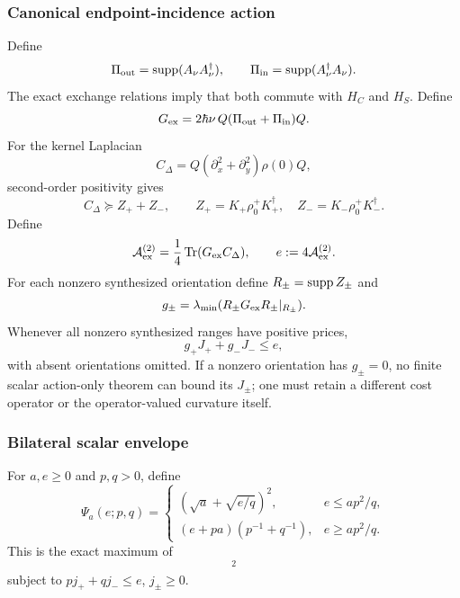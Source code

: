 \subsubsection{Canonical endpoint-incidence action}

Define
\begin{equation}
\Pi_{\rm out}=\operatorname{supp}(A_\nu A_\nu^\dagger),
\qquad
\Pi_{\rm in}=\operatorname{supp}(A_\nu^\dagger A_\nu).
\end{equation}
The exact exchange relations imply that both commute with $H_C$ and $H_S$. Define
\begin{equation}
G_{\rm ex}
=2\hbar\nu\,Q(\Pi_{\rm out}+\Pi_{\rm in})Q.
\label{eq:mixed-r1-Gex}
\end{equation}
For the kernel Laplacian
\begin{equation}
C_\Delta=Q(\partial_x^2+\partial_y^2)\rho(0)Q,
\end{equation}
second-order positivity gives
\begin{equation}
C_\Delta\succeq Z_++Z_-,
\qquad
Z_+=K_+\rho_0^+K_+^\dagger,
\quad
Z_-=K_-\rho_0^+K_-^\dagger.
\end{equation}
Define
\begin{equation}
\mathcal A_{\rm ex}^{(2)}=\frac14\operatorname{Tr}(G_{\rm ex}C_\Delta),
\qquad
e:=4\mathcal A_{\rm ex}^{(2)}.
\end{equation}
For each nonzero synthesized orientation define $R_\pm=\operatorname{supp} Z_\pm$ and
\begin{equation}
g_\pm=\lambda_{\min}(R_\pm G_{\rm ex}R_\pm|_{R_\pm}).
\end{equation}
Whenever all nonzero synthesized ranges have positive prices,
\begin{equation}
g_+J_+ +g_-J_-\le e,
\label{eq:mixed-r1-action-budget}
\end{equation}
with absent orientations omitted. If a nonzero orientation has $g_\pm=0$, no finite scalar action-only theorem can bound its $J_\pm$; one must retain a different cost operator or the operator-valued curvature itself.

\subsubsection{Bilateral scalar envelope}

For $a,e\ge0$ and $p,q>0$, define
\begin{equation}
\Psi_a(e;p,q)=
\begin{cases}
(\sqrt a+\sqrt{e/q})^2,&e\le ap^2/q,\\[1mm]
(e+pa)(p^{-1}+q^{-1}),&e\ge ap^2/q.
\end{cases}
\label{eq:mixed-r1-Psi}
\end{equation}
This is the exact maximum of
\begin{equation}
[\sqrt{a+j_+}+\sqrt{j_-}]^2
\end{equation}
subject to $pj_++qj_-\le e$, $j_\pm\ge0$.

